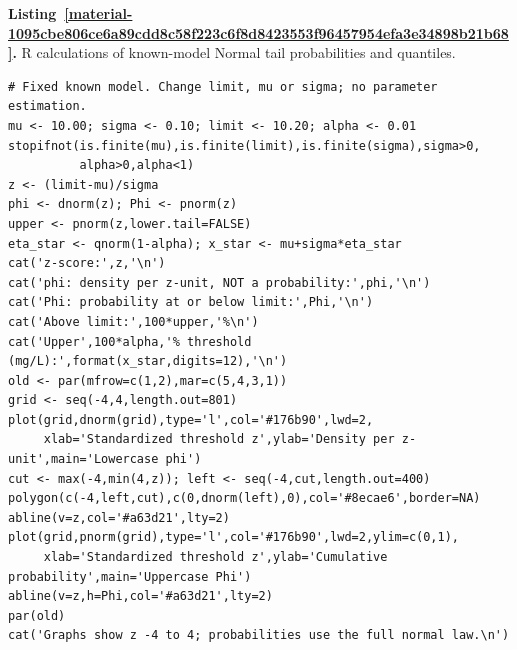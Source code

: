 \documentclass[11pt,a4paper]{article}
\newcounter{listing}
\begin{document}

\medskip

\par\medskip
{}
\label{material-1095cbe806ce6a89cdd8c58f223c6f8d8423553f96457954efa3e34898b21b68}
\noindent\textbf{Listing~\ref*{material-1095cbe806ce6a89cdd8c58f223c6f8d8423553f96457954efa3e34898b21b68}.} R calculations of known-model Normal tail probabilities and quantiles.\par\nopagebreak
\begin{Verbatim}[fontsize=\footnotesize,breaklines=true,breakanywhere=true]
# Fixed known model. Change limit, mu or sigma; no parameter estimation.
mu <- 10.00; sigma <- 0.10; limit <- 10.20; alpha <- 0.01
stopifnot(is.finite(mu),is.finite(limit),is.finite(sigma),sigma>0,
          alpha>0,alpha<1)
z <- (limit-mu)/sigma
phi <- dnorm(z); Phi <- pnorm(z)
upper <- pnorm(z,lower.tail=FALSE)
eta_star <- qnorm(1-alpha); x_star <- mu+sigma*eta_star
cat('z-score:',z,'\n')
cat('phi: density per z-unit, NOT a probability:',phi,'\n')
cat('Phi: probability at or below limit:',Phi,'\n')
cat('Above limit:',100*upper,'%\n')
cat('Upper',100*alpha,'% threshold (mg/L):',format(x_star,digits=12),'\n')
old <- par(mfrow=c(1,2),mar=c(5,4,3,1))
grid <- seq(-4,4,length.out=801)
plot(grid,dnorm(grid),type='l',col='#176b90',lwd=2,
     xlab='Standardized threshold z',ylab='Density per z-unit',main='Lowercase phi')
cut <- max(-4,min(4,z)); left <- seq(-4,cut,length.out=400)
polygon(c(-4,left,cut),c(0,dnorm(left),0),col='#8ecae6',border=NA)
abline(v=z,col='#a63d21',lty=2)
plot(grid,pnorm(grid),type='l',col='#176b90',lwd=2,ylim=c(0,1),
     xlab='Standardized threshold z',ylab='Cumulative probability',main='Uppercase Phi')
abline(v=z,h=Phi,col='#a63d21',lty=2)
par(old)
cat('Graphs show z -4 to 4; probabilities use the full normal law.\n')

\end{Verbatim}
\end{document}
